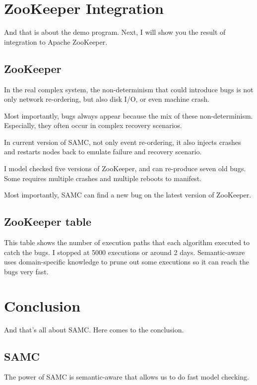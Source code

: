 \section{ZooKeeper Integration}

And that is about the demo program. Next, I will show you the result of
integration to Apache ZooKeeper.

\subsection{ZooKeeper}

In the real complex system, the non-determinism that could introduce bugs is not
only network re-ordering, but also disk I/O, or even machine crash. 

Most importantly, bugs always appear because the mix of these non-determinism.
Especially, they often occur in complex recovery scenarios.

In current version of SAMC, not only event re-ordering, it also injects
crashes and restarts nodes back to emulate failure and recovery scenario.

I model checked five versions of ZooKeeper, and can re-produce seven old bugs.
Some requires multiple crashes and multiple reboots to manifest.

Most importantly, SAMC can find a new bug on the latest version of ZooKeeper.

\subsection{ZooKeeper table}

This table shows the number of execution paths that each algorithm executed to
catch the bugs. I stopped at 5000 executions or around 2 days. Semantic-aware
uses domain-specific knowledge to prune out some executions so it can reach the
bugs very fast.

\section{Conclusion}

And that's all about SAMC. Here comes to the conclusion.

\subsection{SAMC}

The power of SAMC is semantic-aware that allows us to do fast  model checking.

